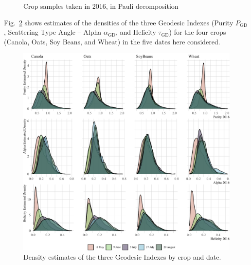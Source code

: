 \documentclass[journal]{IEEEtran}
\begin{document}
\begin{figure}[hbt]
  \centering
  \caption{Crop samples taken in 2016, in Pauli decomposition}
  \label{fig:sample_images}
\end{figure}

Fig.~\ref{fig:AllIndexes} shows estimates of the densities of the three Geodesic Indexes (Purity $P_{\text{GD}}$, Scattering Type Angle -- Alpha $\alpha_{\text{GD}}$, and Helicity $\tau_{\text{GD}}$) for the four crops (Canola, Oats, Soy Beans, and Wheat) in the five dates here considered.

\begin{figure}[htb]
\centering
\includegraphics[width=.7\linewidth]{Indexes}
\caption{Density estimates of the three Geodesic Indexes by crop and date.}\label{fig:AllIndexes}
\end{figure}
\end{document}
